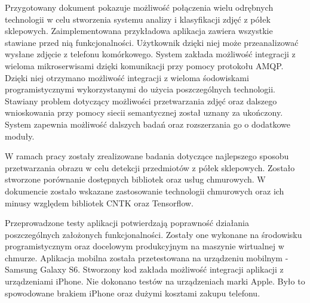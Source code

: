 Przygotowany dokument pokazuje możliwość połączenia wielu odrębnych technologii w celu stworzenia systemu analizy i klasyfikacji zdjęć z półek sklepowych. Zaimplementowana przykładowa aplikacja zawiera wszystkie stawiane przed nią funkcjonalności. Użytkownik dzięki niej może przeanalizować wysłane zdjęcie z telefonu komórkowego. System zakłada możliwość integracji z wieloma mikroserwisami dzięki komunikacji przy pomocy protokołu AMQP. Dzięki niej otrzymano możliwość integracji z wieloma śodowiskami programistycznymi wykorzystanymi do użycia poszczególnych technologii. Stawiany problem dotyczący możliwości przetwarzania zdjęć oraz dalszego wnioskowania przy pomocy siecii semantycznej został uznany za ukończony. System zapewnia możliwość dalszych badań oraz rozszerzania go o dodatkowe moduły.

W ramach pracy zostały zrealizowane badania dotyczące najlepszego sposobu przetwarzania obrazu w celu detekcji przedmiotów z półek sklepowych. Zostało stworzone porównanie dostępnych bibliotek oraz usług chmurowych. W dokumencie zostało wskazane zastosowanie technologii chmurowych oraz ich minusy względem bibliotek CNTK oraz Tensorflow. 

Przeprowadzone testy aplikacji potwierdzają poprawność działania poszczególnych założonych funkcjonalności. Zostały one wykonane na środowisku programistycznym oraz docelowym produkcyjnym na maszynie wirtualnej w chmurze. Aplikacja mobilna została przetestowana na urządzeniu mobilnym - Samsung Galaxy S6. Stworzony kod zakłada możliwość integracji aplikacji z urządzeniami iPhone. Nie dokonano testów na urządzeniach marki Apple. Było to spowodowane brakiem iPhone oraz dużymi kosztami zakupu telefonu.